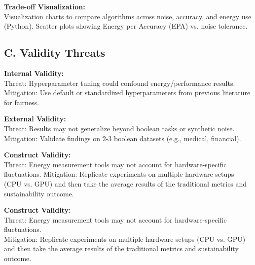 \documentclass[conference]{IEEEtran}
\begin{document}
\vspace{0.5em}
\textbf{Trade-off Visualization:}\\
Visualization charts to compare algorithms across noise, accuracy, and energy use (Python). Scatter plots showing Energy per Accuracy (EPA) vs. noise tolerance.

\vspace{0.5em}
\subsection*{C. Validity Threats}

\textbf{Internal Validity:}\\
Threat: Hyperparameter tuning could confound energy/performance results. Mitigation: Use default or standardized hyperparameters from previous literature for fairness.

\vspace{0.5em}
\textbf{External Validity:}\\
Threat: Results may not generalize beyond boolean tasks or synthetic noise. Mitigation: Validate findings on 2-3 boolean datasets (e.g., medical, financial).

\vspace{0.5em}
\textbf{Construct Validity:}\\
Threat: Energy measurement tools may not account for hardware-specific fluctuations. Mitigation: Replicate experiments on multiple hardware setups (CPU vs. GPU) and then take the average results of the traditional metrics and sustainability outcome.


\textbf{Construct Validity:}\\[0.5em]
Threat: Energy measurement tools may not account for hardware-specific fluctuations.\\[0.5em]
Mitigation: Replicate experiments on multiple hardware setups (CPU vs. GPU) and then take the average results of the traditional metrics and sustainability outcome.





\end{document}
